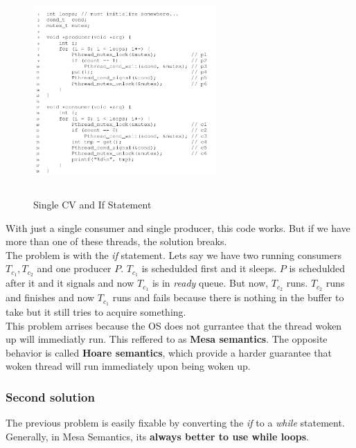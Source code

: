 \begin{figure}[h!]
    \begin{center}
        \includegraphics[width=7cm, height=8cm]{img/308.png}
        \caption{Single CV and If Statement}
    \end{center}
\end{figure}

With just a single consumer and single producer, this code works. But if we have
more than one of these threads, the solution breaks.\\

The problem is with the \textit{if} statement. Lets say we have
two running consumers $T_{c_1}, T_{c_2}$ and one producer $P$. $T_{c_1}$
is schedulded first and it sleeps. $P$ is schedulded after it and it signals
and now $T_{c_1}$ is in \textit{ready} queue. But now, $T_{c_2}$ runs.
$T_{c_2}$ runs and finishes and now $T_{c_1}$ runs and fails because there
is nothing in the buffer to take but it still tries to acquire something.\\

This problem arrises because the OS does not gurrantee that the thread
woken up will immediatly run. This reffered to as \textbf{Mesa semantics}.
The opposite behavior is called \textbf{Hoare semantics}, which provide
a harder guarantee that woken thread will run immediately upon being
woken up.

\subsubsection{Second solution}

The previous problem is easily fixable by converting the \textit{if} to a 
\textit{while} statement. Generally, in Mesa Semantics, its \textbf{always better
to use while loops}.\\

